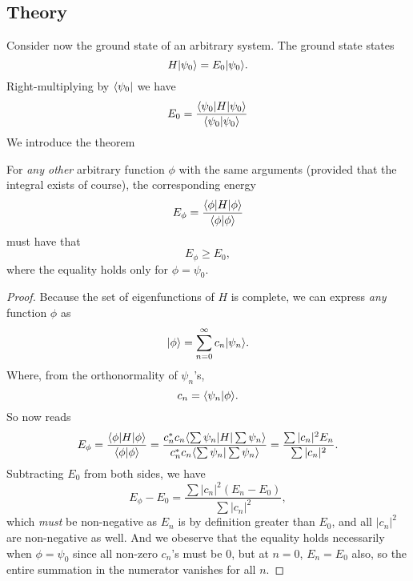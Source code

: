 \subsection{Theory}
Consider now the ground state of an arbitrary system. The ground state \sch states
\begin{equation}
H|\psi_0\rangle=E_0|\psi_0\rangle.
\end{equation}
Right-multiplying by $\langle\psi_0|$ we have
\begin{equation}
E_0=\frac{\langle \psi_0|H|\psi_0\rangle}{\langle \psi_0|\psi_0\rangle}
\end{equation}
We introduce the theorem
\begin{thrm}
For \textit{any other} arbitrary function $\phi$ with the same arguments (provided 
that the integral exists of course), the corresponding energy
\begin{equation}
\label{energyphi}
E_{\phi}=\frac{\langle \phi|H|\phi\rangle}{\langle \phi|\phi\rangle}
\end{equation}
must have that
\begin{equation}
E_{\phi}\geq E_0,
\end{equation}
where the equality holds only for $\phi=\psi_0$.
\end{thrm}
\begin{proof}
Because the set of eigenfunctions of $H$ is complete, we can express \textit{any} 
function $\phi$ as 
\begin{equation}
|\phi\rangle=\sum^{\infty}_{n=0}  c_n|\psi_n\rangle.
\end{equation}
Where, from the orthonormality of $\psi_n$'s,
\begin{equation}
c_n=\langle \psi_n|\phi\rangle.
\end{equation}
So  now reads
\begin{equation}
E_{\phi}=\frac{\langle \phi|H|\phi\rangle}{\langle \phi|\phi\rangle}=\frac{c_n^*c_n\langle \sum\psi_n|H|\sum \psi_n\rangle}{c_n^*c_n\langle \sum\psi_n|\sum \psi_n\rangle}=\frac{\sum |c_n|^2E_n}{\sum |c_n|^2}.
\end{equation}
Subtracting $E_0$ from both sides, we have
\begin{equation}
E_{\phi}-E_0=\frac{\sum |c_n|^2(E_n-E_0)}{\sum |c_n|^2},
\end{equation}
which \textit{must} be non-negative as $E_n$ is by definition greater than $E_0$, 
and all $|c_n|^2$ are non-negative as well. And we obeserve that the equality 
holds necessarily when $\phi=\psi_0$ since all non-zero $c_n$'s must be $0$, but 
at $n=0$, $E_n=E_0$ also, so the entire summation in the numerator vanishes for 
all $n$. 
\end{proof}
